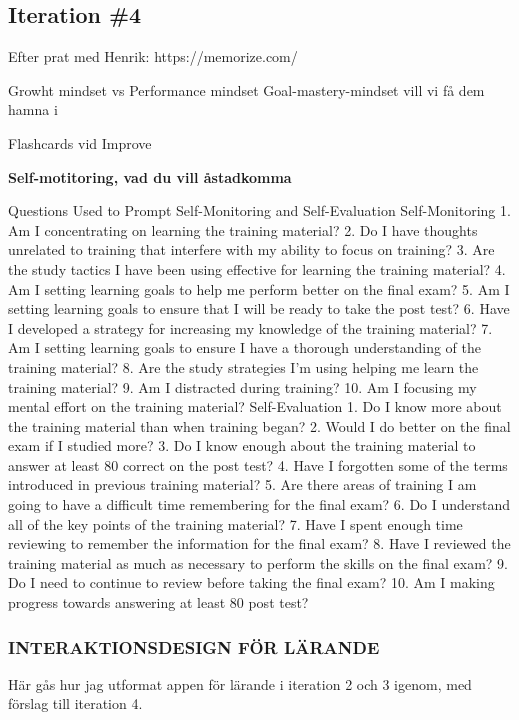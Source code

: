 \subsection{Iteration \#4}

Efter prat med Henrik:
https://memorize.com/

Growht mindset vs Performance mindset
Goal-mastery-mindset vill vi få dem hamna i

Flashcards vid Improve

\textbf{Self-motitoring, vad du vill åstadkomma}

Questions Used to Prompt Self-Monitoring and Self-Evaluation
Self-Monitoring
1. Am I concentrating on learning the training material?
2. Do I have thoughts unrelated to training that interfere with my ability to focus on training?
3. Are the study tactics I have been using effective for learning the training material?
4. Am I setting learning goals to help me perform better on the final exam?
5. Am I setting learning goals to ensure that I will be ready to take the post test?
6. Have I developed a strategy for increasing my knowledge of the training material?
7. Am I setting learning goals to ensure I have a thorough understanding of the training
material?
8. Are the study strategies I'm using helping me learn the training material?
9. Am I distracted during training?
10. Am I focusing my mental effort on the training material?
Self-Evaluation
1. Do I know more about the training material than when training began?
2. Would I do better on the final exam if I studied more?
3. Do I know enough about the training material to answer at least 80%
correct on the post test?
4. Have I forgotten some of the terms introduced in previous training material?
5. Are there areas of training I am going to have a difficult time remembering for the final
exam?
6. Do I understand all of the key points of the training material?
7. Have I spent enough time reviewing to remember the information for the final exam?
8. Have I reviewed the training material as much as necessary to perform the skills on the
final exam?
9. Do I need to continue to review before taking the final exam?
10. Am I making progress towards answering at least 80%
post test?

\subsubsection{INTERAKTIONSDESIGN FÖR LÄRANDE}
Här gås hur jag utformat appen för lärande i iteration 2 och 3 igenom, med förslag till iteration 4.

